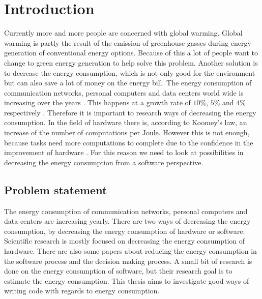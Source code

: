 \chapter{Introduction}
\label{ch:introduction}
Currently more and more people are concerned with global warming. Global warming is partly the result of the emission of greenhouse gasses during energy generation of conventional energy options. Because of this a lot of people want to change to green energy generation to help solve this problem. Another solution is to decrease the energy consumption, which is not only good for the environment but can also save a lot of money on the energy bill. The energy consumption of communication networks, personal computers and data centers world wide is increasing over the years \cite{van2014trends}. This happens at a growth rate of $10\%$, $5\%$ and $4\%$ respectively \cite{van2014trends}. Therefore it is important to research ways of decreasing the energy consumption. In the field of hardware there is, according to Koomey's law, an increase of the number of computations per Joule. However this is not enough, because tasks need more computations to complete due to the confidence in the improvement of hardware \cite{verdecchia2017estimating}. For this reason we need to look at possibilities in decreasing the energy consumption from a software perspective.


\section{Problem statement}
The energy consumption of communication networks, personal computers and data centers are increasing yearly. There are two ways of decreasing the energy consumption, by decreasing the energy consumption of hardware or software. Scientific research is mostly focused on decreasing the energy consumption of hardware. There are also some papers about reducing the energy consumption in the software process and the decision making process. A small bit of research is done on the energy consumption of software, but their research goal is to estimate the energy consumption. This thesis aims to investigate good ways of writing code with regards to energy consumption.


